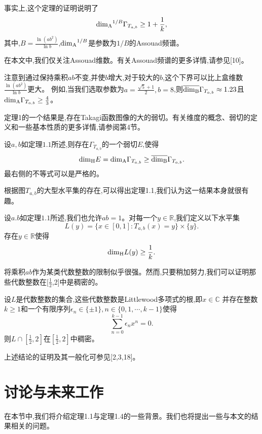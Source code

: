 \begin{remark}
      事实上,这个定理的证明说明了
      $$
      \mathrm{\dim_A}^{1/B}\Gamma_{T_{a,b}}\ge1+\frac{1}{k},
      $$
      其中,$B=\frac{\ln(ab^2)}{\ln b}$,$\mathrm{\dim_A}^{1/B}$是参数为$1/B$的Assouad频谱。
\end{remark}

在本文中,我们仅关注Assouad维数。有关Assouad频谱的更多详情,请参见[10]。

注意到通过保持乘积$ab$不变,并使$b$增大,对于较大的$b$,这个下界可以比上盒维数$\frac{\ln(ab^2)}{\ln b}$更大。
例如,当我们选取参数为$a=\frac{\sqrt{5}+1}{2},b=8$,则$\overline{\mathrm{\dim_B}}\Gamma_{T_{a,b}}\approx1.23$且
$\mathrm{\dim_A}\Gamma_{T_{a,b}}\ge\frac{4}{3}$。

定理1的一个结果是,存在Takagi函数图像的大的弱切。有关维度的概念、弱切的定义和一些基本性质的更多详情,请参阅第4节。

\begin{lemma}[弱切]
      设$a,b$如定理$1.1$所述,则存在$\Gamma_{T_{a,b}}$的一个弱切$E$,使得
      $$
      \mathrm{\dim_H} E=\mathrm{\dim_A}\Gamma_{T_{a,b}}\ge\overline{\mathrm{\dim_B}}\Gamma_{T_{a,b}}.
      $$
      最右侧的不等式可以是严格的。
\end{lemma}

根据图$T_{a,b}$的大型水平集的存在,可以得出定理1.1,我们认为这一结果本身就很有趣。

\begin{theorem}
      设$a.b$如定理$1.1$所述,我们也允许$ab=1$。对每一个$y\in\mathbb{R}$,我们定义以下水平集
      $$
      L(y) = \{x\in[0,1]:T_{a,b}(x)=y\}\times\{y\}.
      $$
      存在$y\in\mathbb{R}$使得
      $$
      \mathrm{\dim_H} L(y)\ge\frac{1}{k}.
      $$
\end{theorem}

将乘积$ab$作为某类代数整数的限制似乎很强。然而,只要稍加努力,我们可以证明那些代数整数在[$\frac{1}{2}$,2]中是稠密的。

\begin{theoremno}
      设$L$是代数整数的集合,这些代数整数是Littlewood多项式的根,即$x\in\mathbb{C}$
      并存在整数$k\ge1$和一个有限序列$\epsilon_n\in\{\pm1\},n\in\{0,1,\cdots,k-1\}$使得
      $$
      \sum_{n=0}^{k-1}\epsilon_nx^n=0.
      $$
      则$L\cap[\frac{1}{2},2]$在$[\frac{1}{2},2]$中稠密。
\end{theoremno}

上述结论的证明及其一般化可参见[2,3,18]。

\section{讨论与未来工作}
在本节中,我们将介绍定理1.1与定理1.4的一些背景。我们也将提出一些与本文的结果相关的问题。

